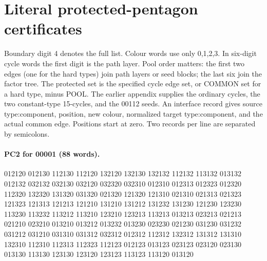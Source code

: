 \documentclass[11pt]{article}
\theoremstyle{remark}
\numberwithin{equation}{section}
\begin{document}
\section{Literal protected-pentagon certificates}
\label{app:protected-pentagon-words}
Boundary digit 4 denotes the full list. Colour words use only 0,1,2,3.
In six-digit cycle words the first digit is the path layer.
Pool order matters: the first two edges (one for the hard types) join
path layers or seed blocks; the last six join the factor tree.
The protected set is the specified cycle edge set, or COMMON set
for a hard type, minus POOL. The earlier appendix supplies the
ordinary cycles, the two constant-type 15-cycles, and the 00112 seeds.
An interface record gives source type:component, position, new colour,
normalized target type:component, and the actual common edge.
Positions start at zero. Two records per line are separated by semicolons.
\paragraph{PC2 for 00001 (88 words).}
\begingroup\footnotesize\ttfamily\begin{flushleft}
012120 012130 112130 112120 132120 132130 132132 112132 113132 013132\\
012132 032132 032130 032120 032320 032310 012310 012313 012323 012320\\
112320 132320 131320 031320 021320 121320 121310 021310 021313 021323\\
121323 121313 121213 121210 131210 131212 131232 131230 121230 123230\\
113230 113232 113212 113210 123210 123213 113213 013213 023213 021213\\
021210 023210 013210 013212 013232 013230 023230 021230 031230 031232\\
031212 031210 031310 031312 032312 012312 112312 132312 131312 131310\\
132310 112310 112313 112323 112123 012123 013123 023123 023120 023130\\
013130 113130 123130 123120 123123 113123 113120 013120\\
\end{flushleft}\endgroup
\end{document}
